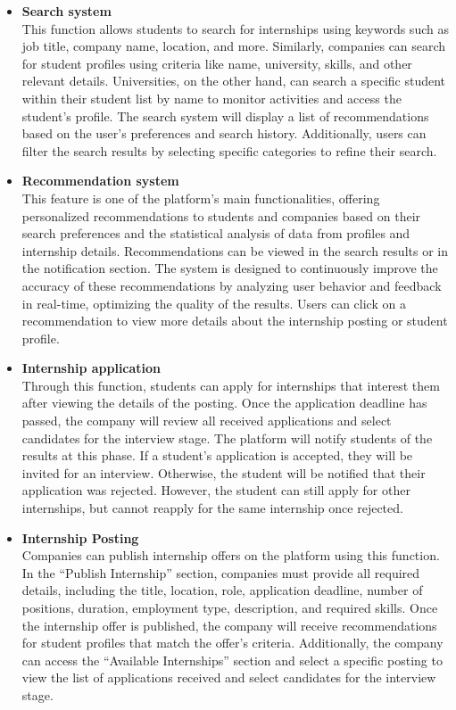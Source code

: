 \begin{itemize}[label={ }]
    \item \textcolor{bluepoli}{\textbf{Search system}}
    \\This function allows students to search for internships using keywords such as job title, company name, location, and more. Similarly, companies 
    can search for student profiles using criteria like name, university, skills, and other relevant details. Universities, on the other hand, can 
    search a specific student within their student list by name to monitor activities and access the student's profile.
    The search system will display a list of recommendations based on the user's preferences and search history. Additionally, users can filter the
    search results by selecting specific categories to refine their search.

    \item \textcolor{bluepoli}{\textbf{Recommendation system}} 
    \\This feature is one of the platform's main functionalities, offering personalized recommendations to students and companies based on their search
    preferences and the statistical analysis of data from profiles and internship details. Recommendations can be viewed in the search results or in 
    the notification section.
    The system is designed to continuously improve the accuracy of these recommendations by analyzing user behavior and feedback in real-time, 
    optimizing the quality of the results. Users can click on a recommendation to view more details about the internship posting or student profile.

    \item \textcolor{bluepoli}{\textbf{Internship application}}
    \\Through this function, students can apply for internships that interest them after viewing the details of the posting. Once the application deadline
    has passed, the company will review all received applications and select candidates for the interview stage. The platform will notify students of 
    the results at this phase. 
    If a student's application is accepted, they will be invited for an interview. Otherwise, the student will be notified that their application was rejected.
    However, the student can still apply for other internships, but cannot reapply for the same internship once rejected.
    \item \textcolor{bluepoli}{\textbf{Internship Posting}}
    \\Companies can publish internship offers on the platform using this function. In the ``Publish Internship'' section, companies must provide all required
    details, including the title, location, role, application deadline, number of positions, duration, employment type, description, and required skills.
    Once the internship offer is published, the company will receive recommendations for student profiles that match the offer’s criteria. Additionally, 
    the company can access the ``Available Internships'' section and select a specific posting to view the list of applications received and select 
    candidates for the interview stage.


\end{itemize}
